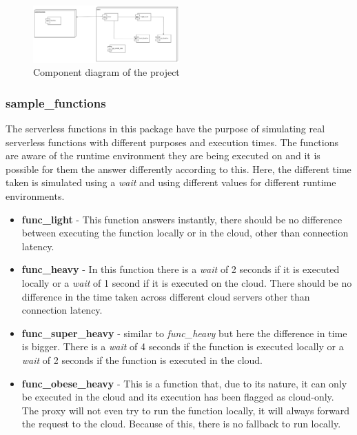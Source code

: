 \documentclass[conference]{IEEEtran}
\begin{document}
\begin{figure}[ht]
  \begin{center}
    \includegraphics[width=0.5\textwidth]{diss-component-diagram}
    \caption{Component diagram of the project}
    \label{fig:component_diagram}
  \end{center}
\end{figure}

\subsubsection*{sample\_functions} \label{overview:sample_functions}

The serverless functions in this package have the purpose of simulating real serverless
functions with different purposes and execution times. The functions are aware of
the runtime environment they are being executed on and it is possible for them the answer
differently according to this. Here, the different time taken is simulated using a
\textit{wait} and using different values for different runtime environments.
 

\begin{itemize}
    \item \textbf{func\_light} - This function answers instantly, there should be
        no difference between executing the function locally or in the cloud,
        other than connection latency.
    \item \textbf{func\_heavy} - In this function there is a \textit{wait} of 2 seconds if
        it is executed locally or a \textit{wait} of 1 second
        if it is executed on the cloud. There should be no difference in the time
        taken across different cloud servers other than connection latency.
    \item \textbf{func\_super\_heavy} - similar to \textit{func\_heavy} but here the
        difference in time is bigger. There is a \textit{wait} of 4 seconds if the
        function is executed locally or a \textit{wait} of 2 seconds if the
        function is executed in the cloud.
    \item \textbf{func\_obese\_heavy} - This is a function that, due to its nature, it can
        only be executed in the cloud and its execution has been flagged as
        cloud-only. The proxy will not even try to run the function locally, it
        will always forward the request to the cloud. Because of this, there is no
        fallback to run locally.
\end{itemize}
\end{document}
